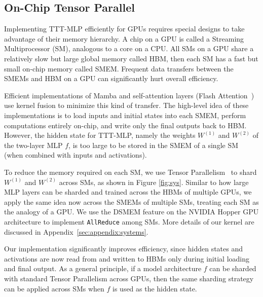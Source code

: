 \subsection{On-Chip Tensor Parallel}
\label{subsec:gpu}
Implementing TTT-MLP efficiently for GPUs requires special designs to take advantage of their memory hierarchy.
A chip on a GPU is called a Streaming Multiprocessor (SM), analogous to a core on a CPU.
All SMs on a GPU share a relatively slow but large global memory called HBM, 
then each SM has a fast but small on-chip memory called SMEM.
Frequent data transfers between the SMEMs and HBM on a GPU can significantly hurt overall efficiency.

Efficient implementations of Mamba and self-attention layers (Flash Attention~\cite{dao2022flashattention}) use kernel fusion to minimize this kind of transfer. 
The high-level idea of these implementations is to load inputs and initial states into each SMEM, perform computations entirely on-chip, and write only the final outputs back to HBM. 
However, the hidden state for TTT-MLP, namely the weights $W^{(1)}$ and $W^{(2)}$ of the two-layer MLP $f$, is too large to be stored in the SMEM of a single SM (when combined with inputs and activations).

To reduce the memory required on each SM, we use Tensor Parallelism~\cite{shoeybi2019megatron} to shard $W^{(1)}$ and $W^{(2)}$ across SMs, as shown in Figure \ref{fig:sys}. 
Similar to how large MLP layers can be sharded and trained across the HBMs of multiple GPUs, 
we apply the same idea now across the SMEMs of multiple SMs, treating each SM as the analogy of a GPU. 
We use the DSMEM feature on the NVIDIA Hopper GPU architecture to implement \texttt{AllReduce} among SMs.
More details of our kernel are discussed in Appendix~\ref{sec:appendix:systems}.

Our implementation significantly improves efficiency, since hidden states and activations are now read from and written to HBMs only during initial loading and final output.
As a general principle, if a model architecture $f$ can be sharded with standard Tensor Parallelism across GPUs, then the same sharding strategy can be applied across SMs when $f$ is used as the hidden state.